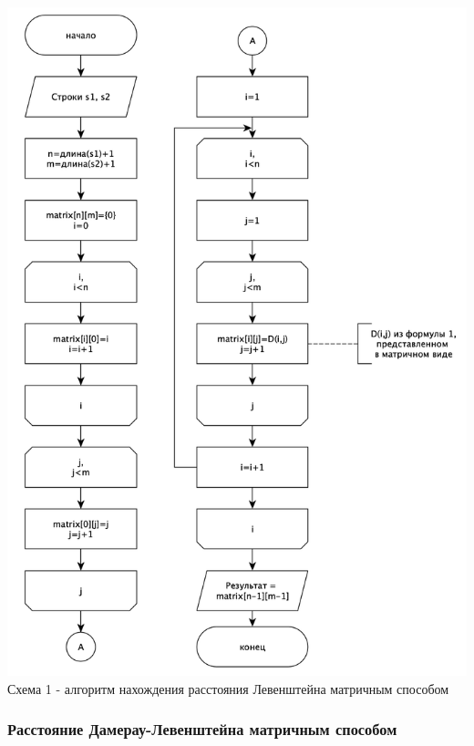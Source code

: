 \documentclass[a4paper,14pt]{article} %
\begin{document}
        \begin{center}
        		\includegraphics[scale = 0.8]{shema1} \\ Схема  1 - алгоритм нахождения расстояния Левенштейна матричным способом
	\end{center}
	
        \subsubsection{Расстояние Дамерау-Левенштейна матричным способом}
        
\end{document}
